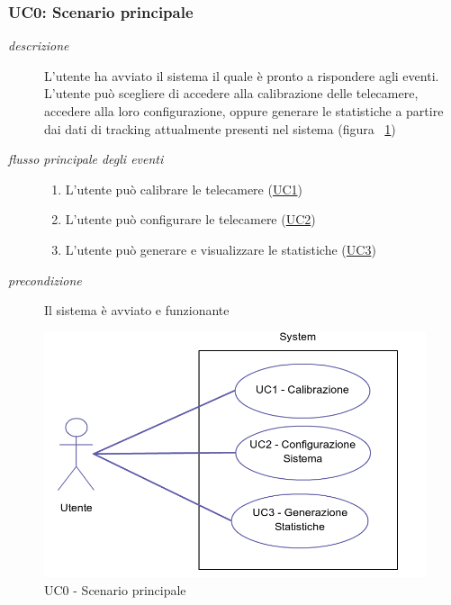 \subsubsection{UC0: Scenario principale} \label{sec:UC0}
\begin{description}
\item[\em{descrizione }]L'utente ha avviato il sistema il quale è pronto a rispondere agli eventi. L'utente può scegliere di accedere alla calibrazione delle telecamere, accedere alla loro configurazione, oppure generare le statistiche a partire dai dati di tracking attualmente presenti nel sistema (figura ~\ref{fig:uc0})
\item[\em{flusso principale degli eventi }] \mbox{}
 \begin{enumerate}
\item L'utente può calibrare le telecamere (\hyperref[sec:uc1]{UC1}) 
\item L'utente può configurare le telecamere (\hyperref[sec:uc2]{UC2})
\item L'utente può generare e visualizzare le statistiche (\hyperref[sec:uc3]{UC3})
\end{enumerate}
\item[\em{precondizione }] Il sistema è avviato e funzionante
\end{description}

\begin{figure}[htpb] 

\centering 

\includegraphics[scale=0.4]{./images/uc0.png} 

\caption{UC0 - Scenario principale} 

\label{fig:uc0}

\end{figure} 

